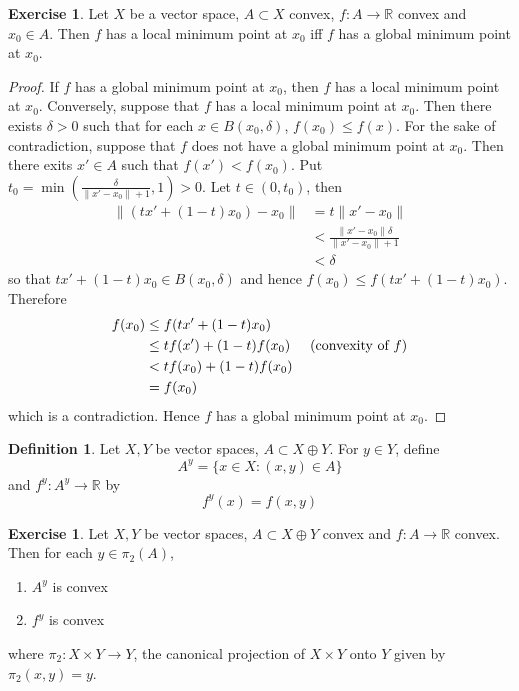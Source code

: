 \documentclass[12pt]{amsart}
\theoremstyle{definition}
\newtheorem{defn}[definition]{Definition}
\theoremstyle{remark}
\theoremstyle{definition}
\newtheorem{ex}[definition]{Exercise}
\newcommand{\del}{\delta}
\newcommand{\R}{\mathbb{R}}
\begin{document}
	\begin{ex}
	Let $X$ be a vector space, $A \subset X$ convex, $f:A \rightarrow \R$ convex and $x_0 \in A$. Then $f$ has a local minimum point at $x_0$ iff $f$ has a global minimum point at $x_0$.
	\end{ex}	
	
	\begin{proof}
	If $f$ has a global minimum point at $x_0$, then $f$ has a local minimum point at $x_0$. Conversely, suppose that $f$ has a local minimum point at $x_0$. Then there exists $\del >0$ such that for each $x \in B(x_0, \del)$, $f(x_0) \leq f(x)$. For the sake of contradiction, suppose that $f$ does not have a global minimum point at $x_0$. Then there exits $x' \in A$ such that $f(x') < f(x_0)$. Put $t_0 = \min(\frac{\del}{\|x' - x_0\| + 1}, 1) >0$. Let $t \in (0, t_0)$, then
	\begin{align*}
	\|(tx' + (1-t)x_0) - x_0\| 
	&= t\|x' -x_0 \| \\
	& <   \frac{\|x' -x_0 \|\del}{\|x' -x_0\| + 1} \\
	& < \del
	\end{align*} 
	so that $tx' + (1-t)x_0 \in B(x_0, \del)$ and hence $f(x_0) \leq f(tx' + (1-t)x_0)$.  Therefore  
	\begin{align*}
	f(x_0) 
	& \leq f(tx' + (1-t)x_0) \\
	& \leq tf(x') + (1-t)f(x_0)  \hspace{.5cm} (\text{convexity of }f)\\
	& < tf(x_0) + (1-t)f(x_0) \\
	&= f(x_0)
	\end{align*}
	which is a contradiction. Hence $f$ has a global minimum point at $x_0$.
	\end{proof}
	
	\begin{defn}
	Let $X, Y$ be vector spaces, $A \subset X \oplus Y$. For $y \in Y$, define $$A^y = \{x \in X: (x,y) \in A \}$$ and $f^y:A^y \rightarrow \R$ by $$f^y(x) = f(x,y)$$
	\end{defn}
	
	\begin{ex}
	Let $X, Y$ be vector spaces, $A \subset X \oplus Y$ convex and $f:A \rightarrow \R$ convex. Then for each $y \in \pi_2(A)$,
	\begin{enumerate}
	\item $A^y$ is convex 
	\item $f^y$ is convex  
	\end{enumerate}	  
	where $\pi_2: X\times Y \rightarrow Y$, the canonical projection of $X \times Y$ onto $Y$ given by $\pi_2(x,y) = y$.
	\end{ex}
	
\end{document}
